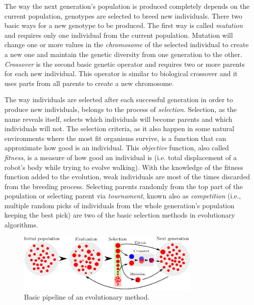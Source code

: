 The way the next generation's population is produced completely depends on the current population, genotypes are selected to breed new individuals. There two basic ways for a new genotype to be produced. The first way is called \emph{mutation} and requires only one individual from the current population. Mutation will change one or more values in the \emph{chromosome} of the selected individual to create a new one and maintain the genetic diversity from one generation to the other. \emph{Crossover} is the second basic genetic operator and requires two or more parents for each new individual. This operator is similar to biological crossover and it uses parts from all parents to create a new chromosome.

The way individuals are selected after each successful generation in order to produce new individuals, belongs to the process of \emph{selection}. Selection, as the name reveals itself, selects which individuals will become parents and which individuals will not. The selection criteria, as it also happen in some natural environments where the most fit organisms survive, is a function that can approximate how good is an individual. This \emph{objective} function, also called \emph{fitness}, is a measure of how good an individual is (i.e. total displacement of a robot's body while trying to evolve walking). With the knowledge of the fitness function added to the evolution, weak individuals are most of the times discarded from the breeding process. Selecting parents randomly from the top part of the population or selecting parent via \emph{tournament}, known also as \emph{competition} (i.e., multiple random picks of individuals from the whole generation's population keeping the best pick) are two of the basic selection methods in evolutionary algorithms.

\begin{figure}[h!]
\vspace{0.4cm} %
\centering
\includegraphics[width=0.8\textwidth]{../Figures/Misc/Evolution.eps}
\caption{Basic pipeline of an evolutionary method.}
\label{fig:evolutionPipeline}
\end{figure}


